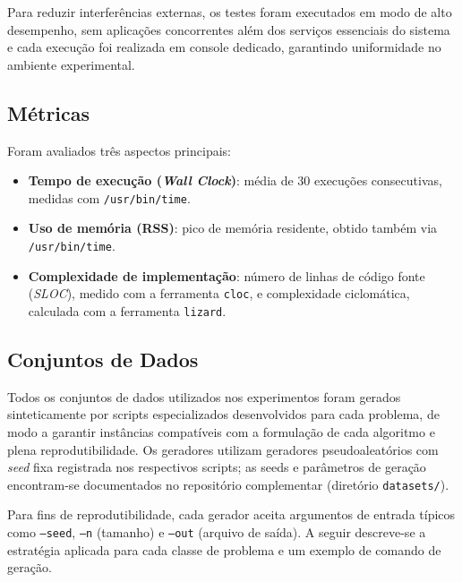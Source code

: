 \documentclass[12pt,a4paper]{article}
\newcommand{\eng}[1]{\textit{#1}}
\begin{document}
Para reduzir interferências externas, os testes foram executados em modo de alto desempenho, sem aplicações concorrentes além dos serviços essenciais do sistema e cada execução foi realizada em console dedicado, garantindo uniformidade no ambiente experimental.

\subsection{Métricas}
Foram avaliados três aspectos principais:
\begin{itemize}
  \item \textbf{Tempo de execução (\eng{Wall Clock})}: média de 30 execuções consecutivas, medidas com \texttt{/usr/bin/time}.
  \item \textbf{Uso de memória (RSS)}: pico de memória residente, obtido também via \texttt{/usr/bin/time}.
  \item \textbf{Complexidade de implementação}: número de linhas de código fonte (\eng{SLOC}), medido com a ferramenta \texttt{cloc}, e complexidade ciclomática, calculada com a ferramenta \texttt{lizard}.
\end{itemize}

\subsection{Conjuntos de Dados}
Todos os conjuntos de dados utilizados nos experimentos foram gerados sinteticamente por scripts especializados desenvolvidos para cada problema, de modo a garantir instâncias compatíveis com a formulação de cada algoritmo e plena reprodutibilidade. Os geradores utilizam geradores pseudoaleatórios com \emph{seed} fixa registrada nos respectivos scripts; as seeds e parâmetros de geração encontram-se documentados no repositório complementar (diretório \texttt{datasets/}).

Para fins de reprodutibilidade, cada gerador aceita argumentos de entrada típicos como \texttt{--seed}, \texttt{--n} (tamanho) e \texttt{--out} (arquivo de saída). A seguir descreve-se a estratégia aplicada para cada classe de problema e um exemplo de comando de geração.
\end{document}
